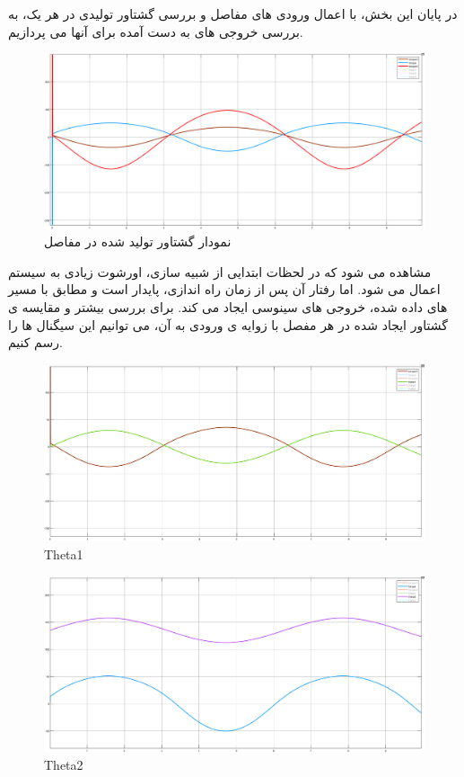 در پایان این بخش، با اعمال ورودی های مفاصل و بررسی گشتاور تولیدی در هر یک، به بررسی خروجی های به دست آمده برای آنها می پردازیم.
\begin{figure}[H]
	\centering
	\includegraphics[width=1\linewidth]{../img/5}
	\caption{نمودار گشتاور تولید شده در مفاصل}
	\label{fig:5}
\end{figure}
مشاهده می شود که در لحظات ابتدایی از شبیه سازی، اورشوت زیادی به سیستم اعمال می شود. اما رفتار آن پس از زمان راه اندازی،  پایدار است و مطابق با مسیر های داده شده، خروجی های سینوسی ایجاد می کند. برای بررسی بیشتر و مقایسه ی گشتاور ایجاد شده در هر مفصل با زوایه ی ورودی به آن، می توانیم این سیگنال ها را رسم کنیم.
\begin{figure}[H]
	\centering
	\includegraphics[width=1\linewidth]{../img/6}
	\caption{Theta1}
	\label{fig:6}
\end{figure}
\begin{figure}[H]
	\centering
	\includegraphics[width=1\linewidth]{../img/7}
	\caption{Theta2}
	\label{fig:7}
\end{figure}
